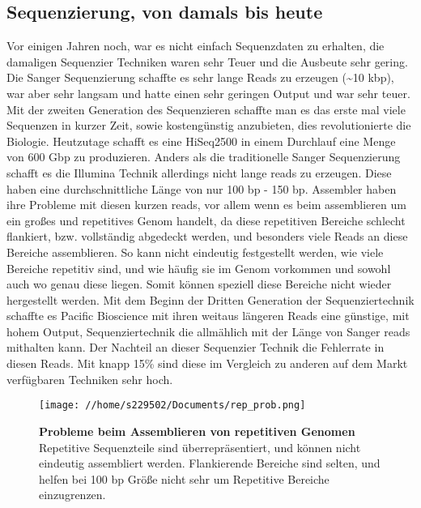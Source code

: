 \documentclass{scrartcl}
\begin{document}
\subsection{Sequenzierung, von damals bis heute}
\label{sec-3-1}
Vor einigen Jahren noch, war es nicht einfach Sequenzdaten zu erhalten, die damaligen Sequenzier Techniken waren sehr Teuer und die
Ausbeute sehr gering. Die Sanger Sequenzierung schaffte es sehr lange Reads zu erzeugen (\textasciitilde{}10 kbp), war aber sehr langsam
und hatte einen sehr geringen Output und war sehr teuer. Mit der zweiten Generation des Sequenzieren schaffte man es das erste mal viele Sequenzen in kurzer Zeit,
sowie kostengünstig anzubieten, dies revolutionierte die Biologie. Heutzutage schafft es eine HiSeq2500 in einem Durchlauf eine Menge von 
600 Gbp zu produzieren. Anders als die traditionelle Sanger Sequenzierung schafft es die Illumina Technik allerdings nicht lange reads zu erzeugen.
Diese haben eine durchschnittliche Länge von nur 100 bp - 150 bp. Assembler haben ihre Probleme mit diesen kurzen reads, vor allem wenn es
beim assemblieren um ein großes und repetitives Genom handelt, da diese repetitiven Bereiche schlecht flankiert, bzw. vollständig abgedeckt  
werden, und besonders viele Reads an diese Bereiche assemblieren. So kann nicht eindeutig festgestellt werden, wie viele Bereiche 
repetitiv sind, und wie häufig sie im Genom vorkommen und sowohl auch wo genau diese liegen. Somit können speziell diese Bereiche nicht wieder hergestellt werden. 
Mit dem Beginn der Dritten Generation der Sequenziertechnik schaffte es Pacific Bioscience mit ihren weitaus längeren Reads eine günstige, mit hohem 
Output, Sequenziertechnik die allmählich mit der Länge von Sanger reads mithalten kann. Der Nachteil an dieser Sequenzier Technik
die Fehlerrate in diesen Reads. Mit knapp 15\% sind diese im Vergleich zu anderen auf dem Markt verfügbaren Techniken sehr hoch.
\begin{figure} %
\texttt{[image: //home/s229502/Documents/rep\_prob.png]}
\caption[Probleme beim Assemblieren von repetitiven Genomen]{\textbf{Probleme beim Assemblieren von repetitiven Genomen} Repetitive Sequenzteile sind überrepräsentiert, und können nicht eindeutig assembliert werden. Flankierende Bereiche sind selten, und helfen bei 100 bp Größe nicht sehr um Repetitive Bereiche einzugrenzen.}
\end{figure}
\end{document}
